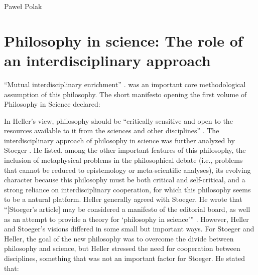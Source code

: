 \begin{artengenv}{Paweł Polak}
\section{Philosophy in science: The role of an interdisciplinary approach}
``Mutual interdisciplinary enrichment''
\parencite[p.7]{pol_heller_introduction_1983}.
was an important core methodological
assumption of this philosophy. The short manifesto opening the first volume of Philosophy in Science declared:



In Heller’s view, philosophy should be ``critically sensitive and open to the resources available to it from the sciences
and other disciplines''
\parencite[p.9]{pol_heller_introduction_1983}.
The interdisciplinary approach of philosophy in
science was further analyzed by Stoeger
\parencite*{pol_stoeger_evolving_1983}.
He listed, among the other important features of this philosophy, the
inclusion of metaphysical problems in the philosophical debate (i.e., problems that cannot be reduced to epistemology
or meta-scientific analyses), its evolving character because this philosophy must be both critical and self-critical,
and a strong reliance on interdisciplinary cooperation, for which this philosophy seems to be a natural platform.
Heller generally agreed with Stoeger. He wrote that ``[Stoeger’s article] may be considered a manifesto of the editorial
board, as well as an attempt to provide a theory for ‘philosophy in science’''
\parencite[p.\pageref{heller-stoeger}]{pol_heller_how_2019}.
However, Heller
and Stoeger’s visions differed in some small but important ways. For Stoeger and Heller, the goal of the new philosophy
was to overcome the divide between philosophy and science, but Heller stressed the need for cooperation between
disciplines, something that was not an important factor for Stoeger. He stated that: 


\end{artengenv}
